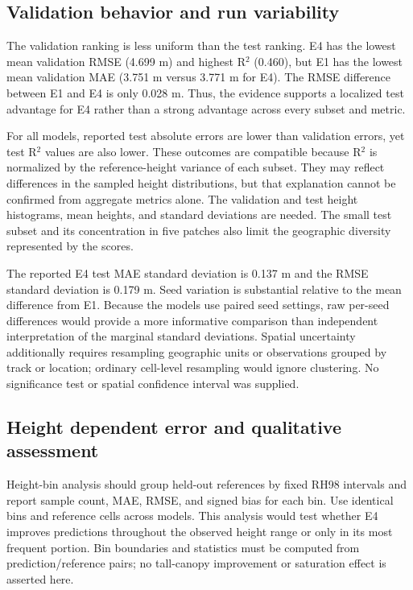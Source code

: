 \subsection{Validation behavior and run variability}

The validation ranking is less uniform than the test ranking. E4 has the lowest mean validation RMSE (4.699 m) and highest R$^2$ (0.460), but E1 has the lowest mean validation MAE (3.751 m versus 3.771 m for E4). The RMSE difference between E1 and E4 is only 0.028 m. Thus, the evidence supports a localized test advantage for E4 rather than a strong advantage across every subset and metric.

For all models, reported test absolute errors are lower than validation errors, yet test R$^2$ values are also lower. These outcomes are compatible because R$^2$ is normalized by the reference-height variance of each subset. They may reflect differences in the sampled height distributions, but that explanation cannot be confirmed from aggregate metrics alone. The validation and test height histograms, mean heights, and standard deviations are needed. The small test subset and its concentration in five patches also limit the geographic diversity represented by the scores.

The reported E4 test MAE standard deviation is 0.137 m and the RMSE standard deviation is 0.179 m. Seed variation is substantial relative to the mean difference from E1. Because the models use paired seed settings, raw per-seed differences would provide a more informative comparison than independent interpretation of the marginal standard deviations. Spatial uncertainty additionally requires resampling geographic units or observations grouped by track or location; ordinary cell-level resampling would ignore clustering. No significance test or spatial confidence interval was supplied.

\subsection{Height dependent error and qualitative assessment}

 Height-bin analysis should group held-out references by fixed RH98 intervals and report sample count, MAE, RMSE, and signed bias for each bin. Use identical bins and reference cells across models. This analysis would test whether E4 improves predictions throughout the observed height range or only in its most frequent portion. Bin boundaries and statistics must be computed from prediction/reference pairs; no tall-canopy improvement or saturation effect is asserted here.

